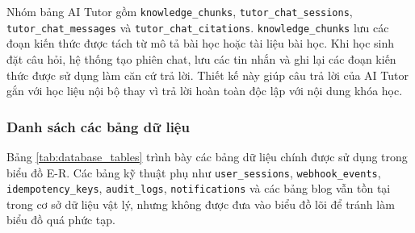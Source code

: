 \documentclass[../DoAn.tex]{subfiles}
\begin{document}
Nhóm bảng AI Tutor gồm \texttt{knowledge\_chunks}, \texttt{tutor\_chat\_sessions}, \texttt{tutor\_chat\_messages} và \texttt{tutor\_chat\_citations}. \texttt{knowledge\_chunks} lưu các đoạn kiến thức được tách từ mô tả bài học hoặc tài liệu bài học. Khi học sinh đặt câu hỏi, hệ thống tạo phiên chat, lưu các tin nhắn và ghi lại các đoạn kiến thức được sử dụng làm căn cứ trả lời. Thiết kế này giúp câu trả lời của AI Tutor gắn với học liệu nội bộ thay vì trả lời hoàn toàn độc lập với nội dung khóa học.

\subsubsection{Danh sách các bảng dữ liệu}

Bảng \ref{tab:database_tables} trình bày các bảng dữ liệu chính được sử dụng trong biểu đồ E-R. Các bảng kỹ thuật phụ như \texttt{user\_sessions}, \texttt{webhook\_events}, \texttt{idempotency\_keys}, \texttt{audit\_logs}, \texttt{notifications} và các bảng blog vẫn tồn tại trong cơ sở dữ liệu vật lý, nhưng không được đưa vào biểu đồ lõi để tránh làm biểu đồ quá phức tạp.
\end{document}

